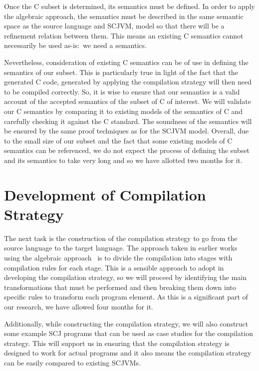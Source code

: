 \documentclass[a4paper,10pt]{report}
\begin{document}
Once the C subset is determined, its semantics must be defined.
In order to apply the algebraic approach, the semantics must be
described in the same semantic space as the source language and SCJVM,
model so that there will be a refinement relation between them.
This means an existing C semantics cannot necessarily be used
as-is:~we need a \Circus{} semantics.

Nevertheless, consideration of existing C semantics can be of use in
defining the semantics of our subset.
This is particularly true in light of the fact that the generated C
code, generated by applying the compilation strategy will then need to
be compiled correctly.
So, it is wise to ensure that our semantics is a valid account of the
accepted semantics of the subset of C of interest.
We will validate our C semantics by comparing it to existing models of
the semantics of C and carefully checking it against the C standard.
The soundness of the semantics will be ensured by the same proof
techniques as for the SCJVM model.
Overall, due to the small size of our subset and the fact that some
existing models of C semantics can be referenced, we do not expect the
process of defining the subset and its semantics to take very long and
so we have allotted two months for it.

\section{Development of Compilation Strategy}

The next task is the construction of the compilation strategy to go
from the source language to the target language.
The approach taken in earlier works using the algebraic
approach~\cite{sampaio1993,duran2005} is to divide the compilation
into stages with compilation rules for each stage.
This is a sensible approach to adopt in developing the compilation
strategy, so we will proceed by identifying the main transformations
that must be performed and then breaking them down into specific rules
to transform each program element.
As this is a significant part of our research, we have allowed four
months for it.

Additionally, while constructing the compilation strategy, we will
also construct some example SCJ programs that can be used as case
studies for the compilation strategy.
This will support us in ensuring that the compilation strategy is
designed to work for actual programs and it also means the
compilation strategy can be easily compared to existing SCJVMs.
\end{document}
